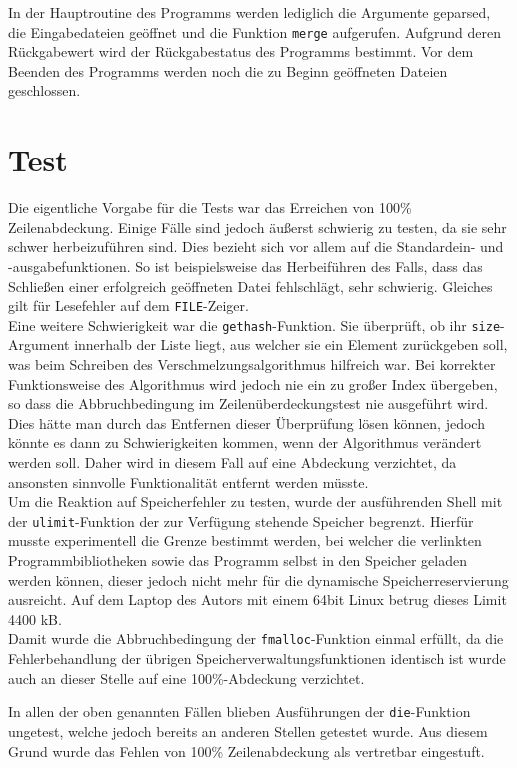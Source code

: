 \documentclass[a4paper,titlepage,12pt]{scrartcl}
\begin{document}
In der Hauptroutine des Programms werden lediglich die Argumente geparsed,
die Eingabedateien geöffnet und die Funktion \texttt{merge} aufgerufen.
Aufgrund deren Rückgabewert wird der Rückgabestatus des Programms bestimmt.
Vor dem Beenden des Programms werden noch die zu Beginn geöffneten Dateien geschlossen.

\section{Test}
\label{sec:test}
Die eigentliche Vorgabe für die Tests war das Erreichen von 100\% Zeilenabdeckung. 
Einige Fälle sind jedoch äußerst schwierig zu testen,
da sie sehr schwer herbeizuführen sind.
Dies bezieht sich vor allem auf die Standardein- und -ausgabefunktionen.
So ist beispielsweise das Herbeiführen des Falls,
dass das Schließen einer erfolgreich geöffneten Datei fehlschlägt,
sehr schwierig.
Gleiches gilt für Lesefehler auf dem \texttt{FILE}-Zeiger.
\\
Eine weitere Schwierigkeit war die \texttt{gethash}-Funktion.
Sie überprüft,
ob ihr \texttt{size}-Argument innerhalb der Liste liegt,
aus welcher sie ein Element zurückgeben soll,
was beim Schreiben des Verschmelzungsalgorithmus hilfreich war.
Bei korrekter Funktionsweise des Algorithmus wird jedoch nie ein zu großer Index übergeben,
so dass die Abbruchbedingung im Zeilenüberdeckungstest nie ausgeführt wird.
Dies hätte man durch das Entfernen dieser Überprüfung lösen können,
jedoch könnte es dann zu Schwierigkeiten kommen,
wenn der Algorithmus verändert werden soll.
Daher wird in diesem Fall auf eine Abdeckung verzichtet,
da ansonsten sinnvolle Funktionalität entfernt werden müsste.
\\
Um die Reaktion auf Speicherfehler zu testen,
wurde der ausführenden Shell mit der \texttt{ulimit}-Funktion der zur Verfügung stehende Speicher begrenzt.
Hierfür musste experimentell die Grenze bestimmt werden,
bei welcher die verlinkten Programmbibliotheken sowie das Programm selbst in den Speicher geladen werden können,
dieser jedoch nicht mehr für die dynamische Speicherreservierung ausreicht.
Auf dem Laptop des Autors mit einem 64bit Linux betrug dieses Limit 4400 kB.
\\
Damit wurde die Abbruchbedingung der \texttt{fmalloc}-Funktion einmal erfüllt,
da die Fehlerbehandlung der übrigen Speicherverwaltungsfunktionen identisch ist wurde auch an dieser Stelle auf eine 100\%-Abdeckung verzichtet.

In allen der oben genannten Fällen blieben Ausführungen der \texttt{die}-Funktion ungetest,
welche jedoch bereits an anderen Stellen getestet wurde.
Aus diesem Grund wurde das Fehlen von 100\% Zeilenabdeckung als vertretbar eingestuft.



\end{document}
